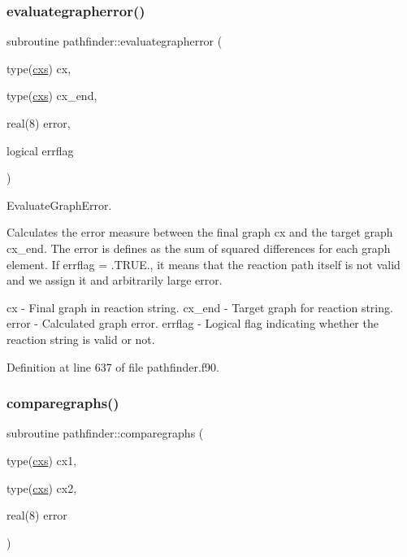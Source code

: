 \subsubsection{\texorpdfstring{evaluategrapherror()}{evaluategrapherror()}}
{\footnotesize\ttfamily subroutine pathfinder\+::evaluategrapherror (\begin{DoxyParamCaption}\item[{type(\mbox{\hyperlink{structchemstr_1_1cxs}{cxs}})}]{cx,  }\item[{type(\mbox{\hyperlink{structchemstr_1_1cxs}{cxs}})}]{cx\+\_\+end,  }\item[{real(8)}]{error,  }\item[{logical}]{errflag }\end{DoxyParamCaption})}



Evaluate\+Graph\+Error. 

Calculates the error measure between the final graph cx and the target graph cx\+\_\+end. The error is defines as the sum of squared differences for each graph element. If errflag = .T\+R\+UE., it means that the reaction path itself is not valid and we assign it and arbitrarily large error.

cx -\/ Final graph in reaction string. cx\+\_\+end -\/ Target graph for reaction string. error -\/ Calculated graph error. errflag -\/ Logical flag indicating whether the reaction string is valid or not. 

Definition at line 637 of file pathfinder.\+f90.

\mbox{\label{namespacepathfinder_a0de07862cb4c5d601bd783c1bb17aace}} 
\subsubsection{\texorpdfstring{comparegraphs()}{comparegraphs()}}
{\footnotesize\ttfamily subroutine pathfinder\+::comparegraphs (\begin{DoxyParamCaption}\item[{type(\mbox{\hyperlink{structchemstr_1_1cxs}{cxs}})}]{cx1,  }\item[{type(\mbox{\hyperlink{structchemstr_1_1cxs}{cxs}})}]{cx2,  }\item[{real(8)}]{error }\end{DoxyParamCaption})}



